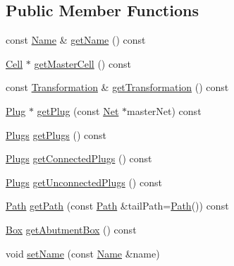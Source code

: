 \subsection*{Public Member Functions}
\begin{DoxyCompactItemize}
\item 
const \mbox{\hyperlink{classHurricane_1_1Name}{Name}} \& \mbox{\hyperlink{classHurricane_1_1Instance_aa48280b4d7127d283c89983cf7a42c23}{get\+Name}} () const
\item 
\mbox{\hyperlink{classHurricane_1_1Cell}{Cell}} $\ast$ \mbox{\hyperlink{classHurricane_1_1Instance_ad08a772e5e36582070cdc407cfcc1a64}{get\+Master\+Cell}} () const
\item 
const \mbox{\hyperlink{classHurricane_1_1Transformation}{Transformation}} \& \mbox{\hyperlink{classHurricane_1_1Instance_a5042051d648fd93548dc6c5e14782645}{get\+Transformation}} () const
\item 
\mbox{\hyperlink{classHurricane_1_1Plug}{Plug}} $\ast$ \mbox{\hyperlink{classHurricane_1_1Instance_a1afe07edc0374ddfb505b4973c902834}{get\+Plug}} (const \mbox{\hyperlink{classHurricane_1_1Net}{Net}} $\ast$master\+Net) const
\item 
\mbox{\hyperlink{namespaceHurricane_ac8335d2057483ee7a935c15a9460c64f}{Plugs}} \mbox{\hyperlink{classHurricane_1_1Instance_a5433b64eed99f9a099004490fae6d8f4}{get\+Plugs}} () const
\item 
\mbox{\hyperlink{namespaceHurricane_ac8335d2057483ee7a935c15a9460c64f}{Plugs}} \mbox{\hyperlink{classHurricane_1_1Instance_a18beeab0def83c20e25a710b30dd8ca9}{get\+Connected\+Plugs}} () const
\item 
\mbox{\hyperlink{namespaceHurricane_ac8335d2057483ee7a935c15a9460c64f}{Plugs}} \mbox{\hyperlink{classHurricane_1_1Instance_a9622b8b961f459469c275b3dafe1733c}{get\+Unconnected\+Plugs}} () const
\item 
\mbox{\hyperlink{classHurricane_1_1Path}{Path}} \mbox{\hyperlink{classHurricane_1_1Instance_a4d13f5b9294d0361b724b5824fd86378}{get\+Path}} (const \mbox{\hyperlink{classHurricane_1_1Path}{Path}} \&tail\+Path=\mbox{\hyperlink{classHurricane_1_1Path}{Path}}()) const
\item 
\mbox{\hyperlink{classHurricane_1_1Box}{Box}} \mbox{\hyperlink{classHurricane_1_1Instance_a29bedbd05939bf43757ef036bb506d01}{get\+Abutment\+Box}} () const
\item 
void \mbox{\hyperlink{classHurricane_1_1Instance_ae3b67792d1659f1a20c6533b8843b905}{set\+Name}} (const \mbox{\hyperlink{classHurricane_1_1Name}{Name}} \&name)

\end{DoxyCompactItemize}
